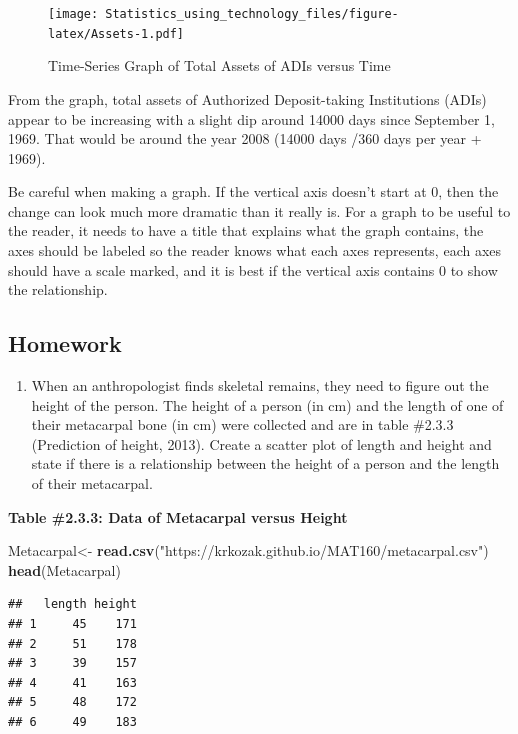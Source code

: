 \documentclass[
]{book}
\newenvironment{Shaded}{\begin{snugshade}}{\end{snugshade}}
\newcommand{\KeywordTok}[1]{\textcolor[rgb]{0.13,0.29,0.53}{\textbf{#1}}}
\newcommand{\NormalTok}[1]{#1}
\newcommand{\StringTok}[1]{\textcolor[rgb]{0.31,0.60,0.02}{#1}}
\providecommand{\tightlist}{%
  \setlength{\itemsep}{0pt}\setlength{\parskip}{0pt}}
\begin{document}
\begin{figure}
\centering
\texttt{[image: Statistics\_using\_technology\_files/figure-latex/Assets-1.pdf]}
\caption{\label{fig:Assets}Time-Series Graph of Total Assets of ADIs versus Time}
\end{figure}

From the graph, total assets of Authorized Deposit-taking Institutions (ADIs) appear to be increasing with a slight dip around 14000 days since September 1, 1969. That would be around the year 2008 (14000 days /360 days per year + 1969).

Be careful when making a graph. If the vertical axis doesn't start at 0, then the change can look much more dramatic than it really is. For a graph to be useful to the reader, it needs to have a title that explains what the graph contains, the axes should be labeled so the reader knows what each axes represents, each axes should have a scale marked, and it is best if the vertical axis contains 0 to show the relationship.

\hypertarget{homework-2}{%
\subsection{Homework}\label{homework-2}}

\begin{enumerate}
\def\labelenumi{\arabic{enumi}.}
\tightlist
\item
  When an anthropologist finds skeletal remains, they need to figure out the height of the person. The height of a person (in cm) and the length of one of their metacarpal bone (in cm) were collected and are in table \#2.3.3 (Prediction of height, 2013). Create a scatter plot of length and height and state if there is a relationship between the height of a person and the length of their metacarpal.
\end{enumerate}

\textbf{Table \#2.3.3: Data of Metacarpal versus Height}

\begin{Shaded}
\begin{Highlighting}[]
\NormalTok{Metacarpal<-}\StringTok{ }\KeywordTok{read.csv}\NormalTok{(}\StringTok{"https://krkozak.github.io/MAT160/metacarpal.csv"}\NormalTok{) }
\KeywordTok{head}\NormalTok{(Metacarpal)}
\end{Highlighting}
\end{Shaded}

\begin{verbatim}
##   length height
## 1     45    171
## 2     51    178
## 3     39    157
## 4     41    163
## 5     48    172
## 6     49    183
\end{verbatim}
\end{document}
